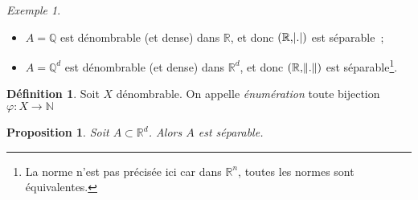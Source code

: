 \documentclass{report}
\newtheorem{prp}[thm]{Proposition}
\theoremstyle{definition}
\newtheorem{déf}[thm]{Définition}
\theoremstyle{remark}
\newtheorem{ex}{Exemple}[chapter]
\numberwithin{equation}{section}
\newcommand{\R}{\mathbb R}
\newcommand{\Q}{\mathbb Q}
\newcommand{\N}{\mathbb N}
\begin{document}
			\begin{ex}~
			\begin{itemize}
				\item $A = \Q$ est dénombrable (et dense) dans $\R$, et donc $(\R, \abs .)$ est séparable~;
				\item $A = \Q^d$ est dénombrable (et dense) dans $\R^d$, et donc $(\R, \norm .)$ est séparable\footnote{La norme n'est pas précisée ici car dans
				$\R^n$, toutes les normes sont équivalentes.}.
			\end{itemize}
			\end{ex}

			\begin{déf} Soit $X$ dénombrable. On appelle \textit{énumération} toute bijection $\varphi : X \to \N$
			\end{déf}

			\begin{prp} Soit $A \subset \R^d$. Alors $A$ est séparable.
			\end{prp}
\end{document}
